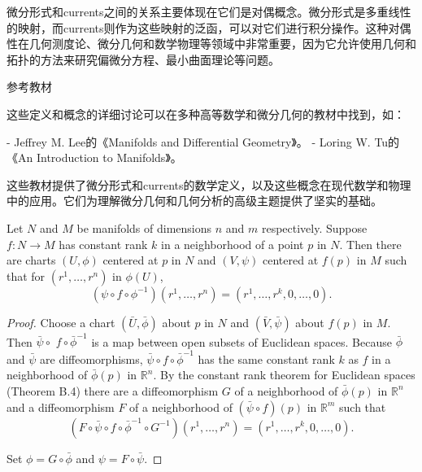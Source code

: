 \documentclass[lang=cn,zihao=-4,a4paper,fontset=none]{beautybook}
\begin{document}
微分形式和currents之间的关系主要体现在它们是对偶概念。微分形式是多重线性的映射，而currents则作为这些映射的泛函，可以对它们进行积分操作。这种对偶性在几何测度论、微分几何和数学物理等领域中非常重要，因为它允许使用几何和拓扑的方法来研究偏微分方程、最小曲面理论等问题。

参考教材

这些定义和概念的详细讨论可以在多种高等数学和微分几何的教材中找到，如：

- Jeffrey M. Lee的《Manifolds and Differential Geometry》。
- Loring W. Tu的《An Introduction to Manifolds》。

这些教材提供了微分形式和currents的数学定义，以及这些概念在现代数学和物理中的应用。它们为理解微分几何和几何分析的高级主题提供了坚实的基础。

\begin{theorem}
    Let $N$ and $M$ be manifolds of dimensions $n$ and $m$ respectively. Suppose $f: N \rightarrow M$ has constant rank $k$ in a neighborhood of a point $p$ in $N$. Then there are charts $(U, \phi)$ centered at $p$ in $N$ and $(V, \psi)$ centered at $f(p)$ in $M$ such that for $\left(r^1, \ldots, r^n\right)$ in $\phi(U)$,
    $$
    \left(\psi \circ f \circ \phi^{-1}\right)\left(r^1, \ldots, r^n\right)=\left(r^1, \ldots, r^k, 0, \ldots, 0\right) .
    $$
\end{theorem}
    \begin{proof}
Choose a chart $(\bar{U}, \bar{\phi})$ about $p$ in $N$ and $(\bar{V}, \bar{\psi})$ about $f(p)$ in $M$. Then $\bar{\psi} \circ$ $f \circ \bar{\phi}^{-1}$ is a map between open subsets of Euclidean spaces. Because $\bar{\phi}$ and $\bar{\psi}$ are diffeomorphisms, $\bar{\psi} \circ f \circ \bar{\phi}^{-1}$ has the same constant rank $k$ as $f$ in a neighborhood of $\bar{\phi}(p)$ in $\mathbb{R}^n$. By the constant rank theorem for Euclidean spaces (Theorem B.4) there are a diffeomorphism $G$ of a neighborhood of $\bar{\phi}(p)$ in $\mathbb{R}^n$ and a diffeomorphism $F$ of a neighborhood of $(\bar{\psi} \circ f)(p)$ in $\mathbb{R}^m$ such that
    $$
    \left(F \circ \bar{\psi} \circ f \circ \bar{\phi}^{-1} \circ G^{-1}\right)\left(r^1, \ldots, r^n\right)=\left(r^1, \ldots, r^k, 0, \ldots, 0\right) .
    $$
    
    Set $\phi=G \circ \bar{\phi}$ and $\psi=F \circ \bar{\psi}$.
    \end{proof}
\end{document}
